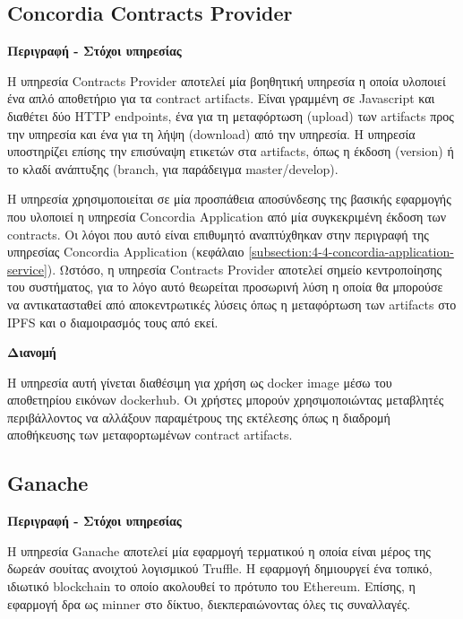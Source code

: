 \subsection{Concordia Contracts Provider} \label{subsection:4-4-concordia-contracts-provider-service}

\vspace{0.5cm}
\textbf{Περιγραφή - Στόχοι υπηρεσίας}

Η υπηρεσία Contracts Provider αποτελεί μία βοηθητική υπηρεσία η οποία υλοποιεί ένα απλό αποθετήριο για τα contract artifacts. Είναι γραμμένη σε Javascript και διαθέτει δύο HTTP endpoints, ένα για τη μεταφόρτωση (upload) των artifacts προς την υπηρεσία και ένα για τη λήψη (download) από την υπηρεσία. Η υπηρεσία υποστηρίζει επίσης την επισύναψη ετικετών στα artifacts, όπως η έκδοση (version) ή το κλαδί ανάπτυξης (branch, για παράδειγμα master/develop).

Η υπηρεσία χρησιμοποιείται σε μία προσπάθεια αποσύνδεσης της βασικής εφαρμογής που υλοποιεί η υπηρεσία Concordia Application από μία συγκεκριμένη έκδοση των contracts. Οι λόγοι που αυτό είναι επιθυμητό αναπτύχθηκαν στην περιγραφή της υπηρεσίας Concordia Application (κεφάλαιο \ref{subsection:4-4-concordia-application-service}). Ωστόσο, η υπηρεσία Contracts Provider αποτελεί σημείο κεντροποίησης του συστήματος, για το λόγο αυτό θεωρείται προσωρινή λύση η οποία θα μπορούσε να αντικατασταθεί από αποκεντρωτικές λύσεις όπως η μεταφόρτωση των artifacts στο IPFS και ο διαμοιρασμός τους από εκεί.

\vspace{0.5cm}
\textbf{Διανομή}

Η υπηρεσία αυτή γίνεται διαθέσιμη για χρήση ως docker image μέσω του αποθετηρίου εικόνων dockerhub. Οι χρήστες μπορούν χρησιμοποιώντας μεταβλητές περιβάλλοντος να αλλάξουν παραμέτρους της εκτέλεσης όπως η διαδρομή αποθήκευσης των μεταφορτωμένων contract artifacts.

\subsection{Ganache} \label{subsection:4-4-ganache-service}

\vspace{0.5cm}
\textbf{Περιγραφή - Στόχοι υπηρεσίας}

Η υπηρεσία Ganache αποτελεί μία εφαρμογή τερματικού η οποία είναι μέρος της δωρεάν σουίτας ανοιχτού λογισμικού Truffle. Η εφαρμογή δημιουργεί ένα τοπικό, ιδιωτικό blockchain το οποίο ακολουθεί το πρότυπο του Ethereum. Επίσης, η εφαρμογή δρα ως minner στο δίκτυο, διεκπεραιώνοντας όλες τις συναλλαγές.

